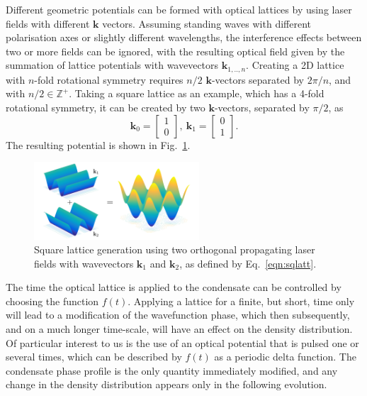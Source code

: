 Different geometric potentials can be formed with optical lattices by using laser fields with different $\mathbf{k}$ vectors. Assuming standing waves with different polarisation axes or slightly different wavelengths, the interference effects between two or more fields can be ignored, with the resulting optical field given by the summation of lattice potentials with wavevectors $\mathbf{k}_{1,..,n}$. Creating a 2D lattice with $n$-fold rotational symmetry requires $n/2$ $\mathbf{k}$-vectors separated by ${2\pi/n}$, and with $n/2 \in \mathbb{Z}^{+}$. Taking a square lattice as an example, which has a 4-fold rotational symmetry, it can be created by two $\mathbf{k}$-vectors, separated by $\pi/2$, as
\begin{equation}
    \mathbf{k}_0 = \left[ \begin{array}{cc}
    1 \\
    0
    \end{array} \right],~
    \mathbf{k}_1 =
    \left[ \begin{array}{cc}
     0 \\
     1
    \end{array} \right].\label{eqn:sqlatt}
\end{equation}
The resulting potential is shown in Fig.~\ref{fig:cos2xy}.
\begin{figure}\centering
    \includegraphics[width=0.55\textwidth]{./Images/ch4_vtx/VOPT/squarelatt}
    \caption{Square lattice generation using two orthogonal propagating laser fields with wavevectors $\mathbf{k}_1$ and $\mathbf{k}_2$, as defined by Eq.~\eqref{eqn:sqlatt}.}\label{fig:cos2xy}
\end{figure}
The time the optical lattice is applied to the condensate can be controlled by choosing the function $f(t)$. Applying a lattice for a finite, but short, time only will lead to a modification of the wavefunction phase, which then subsequently, and on a much longer time-scale, will have an effect on the density distribution. Of particular interest to us is the use of an optical potential that is pulsed one or several times, which can be described by $f(t)$ as a periodic delta function. The condensate phase profile is the only quantity immediately modified, and any change in the density distribution appears only in the following evolution.

